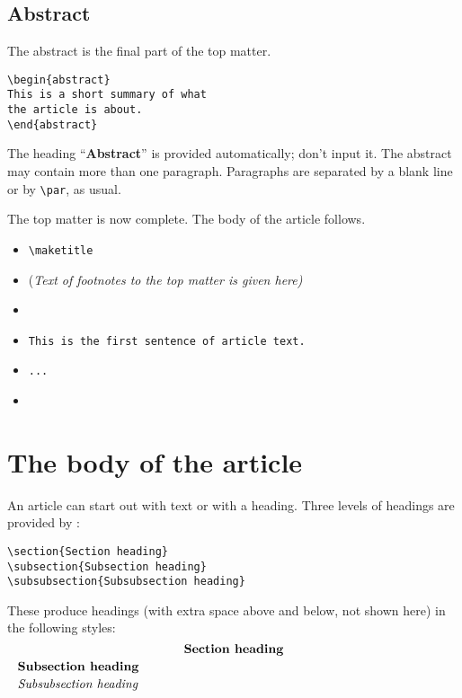 \subsection{Abstract}

The abstract is the final part of the top matter.
\begin{verbatim}
\begin{abstract}
This is a short summary of what
the article is about.
\end{abstract}
\end{verbatim}
\par\noindent
The heading ``{\bf Abstract}'' is provided automatically; don't input it.
The abstract may contain more than one paragraph.  Paragraphs are
separated by a blank line or by \verb"\par", as usual.

The top matter is now complete.  The body of the article follows.
\begin{itemize} \parskip=0pt \itemsep=0pt
\item[] \verb"\maketitle"
\item[] (\it{Text of footnotes to the top matter is given here\/})
\item[] {}
\item[] \verb"This is the first sentence of article text."
\item[] \verb"..."
\item[] \verb""
\end{itemize}











\section{The body of the article}

An article can start out with text or with a heading.
Three levels of headings are provided by \DP:
\begin{verbatim}
\section{Section heading}
\subsection{Subsection heading}
\subsubsection{Subsubsection heading}
\end{verbatim}
These produce headings (with extra space above and below, not shown here)
in the following styles:
$$\vbox{\advance\baselineskip by 2pt
\centerline{\bf Section heading}
\leftline{\bf Subsection heading}
\leftline{\it Subsubsection heading}}
$$

